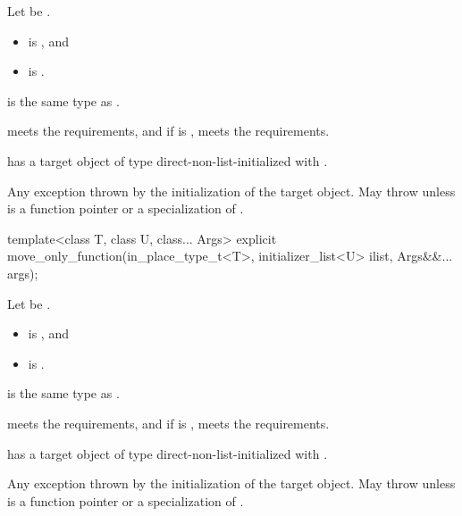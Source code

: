 \begin{itemdescr}
\pnum
Let  be .

\pnum
\constraints
\begin{itemize}
\item
{} is , and
\item
{} is .
\end{itemize}

\pnum
\mandates
{} is the same type as .

\pnum
\expects
{} meets the  requirements, and
if  is ,
 meets the  requirements.

\pnum
\ensures
{} has a target object of type 
direct-non-list-initialized with .

\pnum
\throws
Any exception thrown by the initialization of the target object.
May throw  unless  is
a function pointer or a specialization of .
\end{itemdescr}

%
\begin{itemdecl}
template<class T, class U, class... Args>
  explicit move_only_function(in_place_type_t<T>, initializer_list<U> ilist, Args&&... args);
\end{itemdecl}

\begin{itemdescr}
\pnum
Let  be .

\pnum
\constraints
\begin{itemize}
\item
{} is
, and
\item
{} is .
\end{itemize}

\pnum
\mandates
{} is the same type as .

\pnum
\expects
{} meets the  requirements, and
if  is ,
 meets the  requirements.

\pnum
\ensures
{} has a target object of type 
direct-non-list-initialized with
.

\pnum
\throws
Any exception thrown by the initialization of the target object.
May throw  unless  is
a function pointer or a specialization of .
\end{itemdescr}

